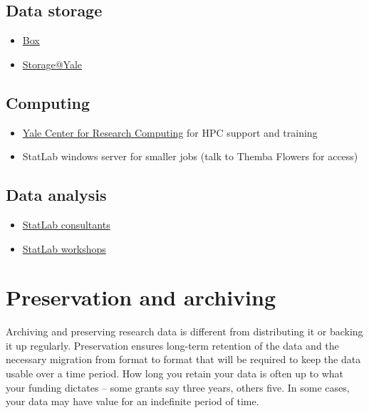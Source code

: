 \subsection{Data storage}\label{data-storage}

\begin{itemize}
\tightlist
\item
  \href{http://its.yale.edu/services/email-and-collaboration-services/document-sharing-and-team-sites/box-yale}{Box}
\item
  \href{http://its.yale.edu/services/email-and-collaboration-services/document-sharing-and-team-sites/storageyale}{Storage@Yale}
\end{itemize}

\subsection{Computing}\label{computing}

\begin{itemize}
\item
  \href{http://research.computing.yale.edu/}{Yale Center for Research
  Computing} for HPC support and training
\item
  StatLab windows server for smaller jobs (talk to Themba Flowers for
  access)
\end{itemize}

\subsection{Data analysis}\label{data-analysis}

\begin{itemize}
\tightlist
\item
  \href{http://csssi.yale.edu/data-and-gis/csssi-statisical-consulting/csssi-statistical-and-gis-consultants}{StatLab
  consultants}
\item
  \href{http://csssi.yale.edu/instruction/workshop-and-instruction-calendar}{StatLab
  workshops}
\end{itemize}

\section{Preservation and archiving}\label{preservation-and-archiving}

Archiving and preserving research data is different from distributing it
or backing it up regularly. Preservation ensures long-term retention of
the data and the necessary migration from format to format that will be
required to keep the data usable over a time period. How long you retain
your data is often up to what your funding dictates -- some grants say
three years, others five. In some cases, your data may have value for an
indefinite period of time.

